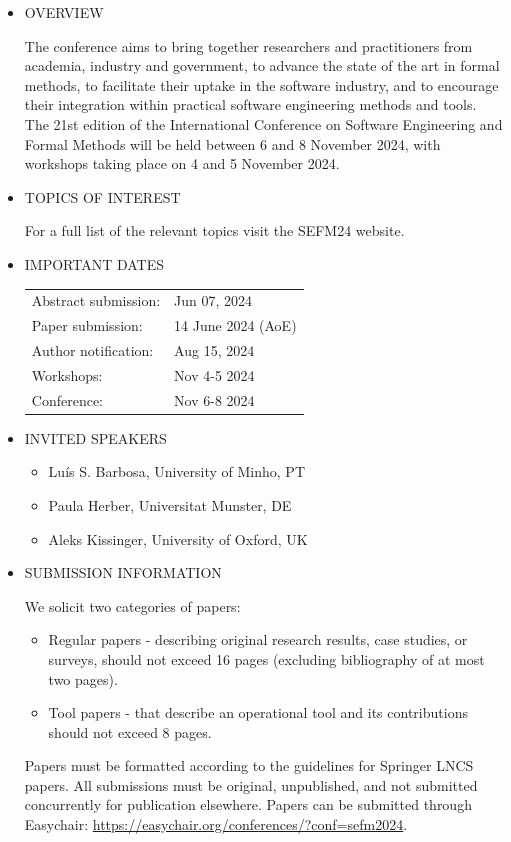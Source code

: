 \documentclass[prodmode,acmtecs]{acmsmall} %
\begin{document}
\begin{itemize}\item  OVERVIEW  
 
  The conference aims to bring together researchers and practitioners from academia, industry and government, to advance the state of the art in formal methods, to facilitate their uptake in the software industry, and to encourage their integration within practical software engineering methods and tools. The 21st edition of the International Conference on Software Engineering and Formal Methods will be held between 6 and 8 November 2024, with workshops taking place on 4 and 5 November 2024. 
 
\item  TOPICS OF INTEREST 
 
  For a full list of the relevant topics visit the SEFM24 website.  
 
\item  IMPORTANT DATES 
 
\begin{tabulary}{\linewidth}{LL}Abstract submission:  & Jun 07, 2024 \\
Paper submission:  & 14 June 2024 (AoE) \\
Author notification:  & Aug 15, 2024 \\
Workshops:  & Nov 4-5 2024 \\
Conference:  & Nov 6-8 2024 \\
\end{tabulary}
 
\item  INVITED SPEAKERS  
 
\begin{itemize}\item  Luís S. Barbosa, University of Minho, PT
\item  Paula Herber, Universitat Munster, DE
\item  Aleks Kissinger, University of Oxford, UK
\end{itemize} 
\item  SUBMISSION INFORMATION 
 
  We solicit two categories of papers: 
 
\begin{itemize}\item  Regular papers - describing original research results, case studies, or surveys, should not exceed 16 pages (excluding bibliography of at most two pages).
\item  Tool papers - that describe an operational tool and its contributions should not exceed 8 pages.
\end{itemize} 
  Papers must be formatted according to the guidelines for Springer LNCS papers. All submissions must be original, unpublished, and not submitted concurrently for publication elsewhere. Papers can be submitted through Easychair: \href{https://easychair.org/conferences/?conf=sefm2024}{https://easychair.org/conferences/?conf=sefm2024}. 
 

\end{itemize}
\end{document}
